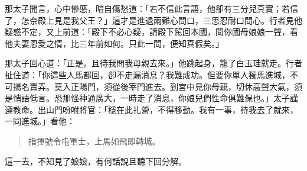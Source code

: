 那太子聞言，心中慘慼，暗自傷愁道：「若不信此言語，他卻有三分兒真實；若信了，怎奈殿上見是我父王？」這才是進退兩難心問口，三思忍耐口問心。行者見他疑惑不定，又上前道：「殿下不必心疑，請殿下駕回本國，問你國母娘娘一聲，看他夫妻恩愛之情，比三年前如何。只此一問，便知真假矣。」

那太子回心道：「正是。且待我問我母親去來。」他跳起身，籠了白玉珪就走。行者扯住道：「你這些人馬都回，卻不走漏消息？我難成功。但要你單人獨馬進城，不可揚名賣弄。莫入正陽門，須從後宰門進去。到宮中見你母親，切休高聲大氣，須是悄語低言。恐那怪神通廣大，一時走了消息，你娘兒們性命俱難保也。」太子謹遵教命。出山門吩咐將官：「穩在此扎營，不得移動。我有一事，待我去了就來，一同進城。」看他：
\begin{quote}
指揮號令屯軍士，上馬如飛即轉城。
\end{quote}

這一去，不知見了娘娘，有何話說且聽下回分解。
